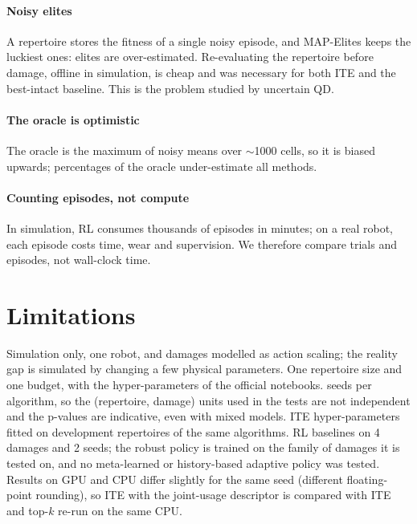 \documentclass[11pt,a4paper]{article}
\begin{document}
\paragraph{Noisy elites} A repertoire stores the fitness of a single noisy episode, and MAP-Elites keeps the luckiest
ones: elites are over-estimated. Re-evaluating the repertoire before damage, offline in simulation, is cheap and was
necessary for both ITE and the best-intact baseline. This is the problem studied by uncertain QD.

\paragraph{The oracle is optimistic} The oracle is the maximum of noisy means over $\sim$1000 cells, so it is biased
upwards; percentages of the oracle under-estimate all methods.

\paragraph{Counting episodes, not compute} In simulation, RL consumes thousands of episodes in minutes; on a real robot,
each episode costs time, wear and supervision. We therefore compare trials and episodes, not wall-clock time.

\section{Limitations}
Simulation only, one robot, and damages modelled as action scaling; the reality gap is simulated by changing a few
physical parameters. One repertoire size and one budget, with the hyper-parameters of the official notebooks.
\NSeeds{} seeds per algorithm, so the (repertoire, damage) units used in the tests are not independent and the
p-values are indicative, even with mixed models. ITE hyper-parameters fitted on development repertoires of the same
algorithms. RL baselines on 4 damages and 2 seeds; the robust policy is trained on the family of damages it is tested
on, and no meta-learned or history-based adaptive policy \citep{nagabandi2019learning,kumar2021rma} was tested.
Results on GPU and CPU differ slightly for the same seed (different floating-point rounding), so ITE with the
joint-usage descriptor is compared with ITE and top-$k$ re-run on the same CPU.
\end{document}
